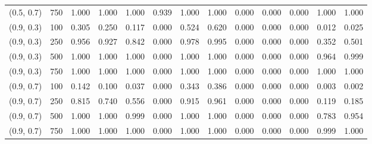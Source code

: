 \begin{table}[ht]
{\begin{tabular}{ll|ccccccccccc}
(0.5, 0.7) & 750 & 1.000 & 1.000 & 1.000 & 0.939 & 1.000 & 1.000 & 0.000 & 0.000 & 0.000 & 1.000 & 1.000 \\
(0.9, 0.3) & 100 & 0.305 & 0.250 & 0.117 & 0.000 & 0.524 & 0.620 & 0.000 & 0.000 & 0.000 & 0.012 & 0.025 \\
(0.9, 0.3) & 250 & 0.956 & 0.927 & 0.842 & 0.000 & 0.978 & 0.995 & 0.000 & 0.000 & 0.000 & 0.352 & 0.501 \\
(0.9, 0.3) & 500 & 1.000 & 1.000 & 1.000 & 0.000 & 1.000 & 1.000 & 0.000 & 0.000 & 0.000 & 0.964 & 0.999 \\
(0.9, 0.3) & 750 & 1.000 & 1.000 & 1.000 & 0.000 & 1.000 & 1.000 & 0.000 & 0.000 & 0.000 & 1.000 & 1.000 \\
(0.9, 0.7) & 100 & 0.142 & 0.100 & 0.037 & 0.000 & 0.343 & 0.386 & 0.000 & 0.000 & 0.000 & 0.003 & 0.002 \\
(0.9, 0.7) & 250 & 0.815 & 0.740 & 0.556 & 0.000 & 0.915 & 0.961 & 0.000 & 0.000 & 0.000 & 0.119 & 0.185 \\
(0.9, 0.7) & 500 & 1.000 & 1.000 & 0.999 & 0.000 & 1.000 & 1.000 & 0.000 & 0.000 & 0.000 & 0.783 & 0.954 \\
(0.9, 0.7) & 750 & 1.000 & 1.000 & 1.000 & 0.000 & 1.000 & 1.000 & 0.000 & 0.000 & 0.000 & 0.999 & 1.000 \\
\hline
\end{tabular}

    }
    \end{table}
    
